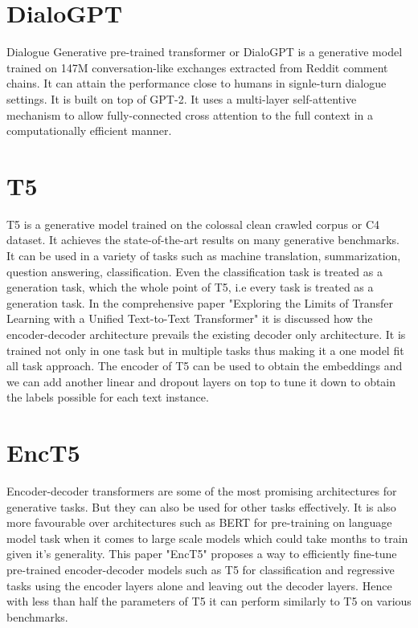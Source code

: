 \section{DialoGPT}
Dialogue Generative pre-trained transformer or DialoGPT\cite{DialoGPTIntro} is a generative model trained on 147M conversation-like exchanges extracted from Reddit comment chains. It can attain the performance close to humans in signle-turn dialogue settings. It is built on top of GPT-2. It uses a multi-layer self-attentive mechanism to allow fully-connected cross attention to the full context in a computationally efficient manner.
\section{T5}
T5\cite{DBLP:journals/corr/abs-1910-10683} is a generative model trained on the colossal clean crawled corpus or C4 dataset. It achieves the state-of-the-art results on many generative benchmarks. It can be used in a variety of tasks such as machine translation, summarization, question answering, classification. Even the classification task is treated as a generation task, which the whole point of T5, i.e every task is treated as a generation task. In the comprehensive paper "Exploring the Limits of Transfer Learning with a Unified Text-to-Text Transformer" it is discussed how the encoder-decoder architecture prevails the existing decoder only architecture. It is trained not only in one task but in multiple tasks thus making it a one model fit all task approach.
The encoder of T5 can be used to obtain the embeddings and we can add another linear and dropout layers on top to tune it down to obtain the labels possible for each text instance.



\section{EncT5}
Encoder-decoder transformers are some of the most promising architectures for generative tasks. But they can also be used for other tasks effectively. It is also more favourable over architectures such as BERT for pre-training on language model task when it comes to large scale models which could take months to train given it's generality. This paper "EncT5"\cite{EncT5Intro} proposes a way to efficiently fine-tune pre-trained encoder-decoder models such as T5 for classification and regressive tasks using the encoder layers alone and leaving out the decoder layers. Hence with less than half the parameters of T5 it can perform similarly to T5 on various benchmarks.


